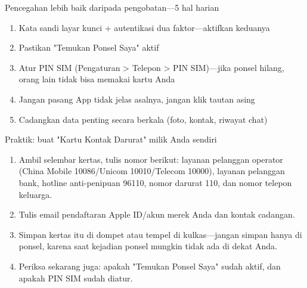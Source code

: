 \begin{tcbwarn}{Pencegahan lebih baik daripada pengobatan—5 hal harian}
\begin{enumerate}
  \item Kata sandi layar kunci + autentikasi dua faktor—aktifkan keduanya
  \item Pastikan "Temukan Ponsel Saya" aktif
  \item Atur PIN SIM (Pengaturan > Telepon > PIN SIM)—jika ponsel hilang, orang lain tidak bisa memakai kartu Anda
  \item Jangan pasang App tidak jelas asalnya, jangan klik tautan asing
  \item Cadangkan data penting secara berkala (foto, kontak, riwayat chat)
\end{enumerate}

\end{tcbwarn}

\begin{tcbpractice}{Praktik: buat "Kartu Kontak Darurat" milik Anda sendiri}
\begin{enumerate}
  \item Ambil selembar kertas, tulis nomor berikut: layanan pelanggan operator (China Mobile 10086/Unicom 10010/Telecom 10000), layanan pelanggan bank, hotline anti-penipuan 96110, nomor darurat 110, dan nomor telepon keluarga.
  \item Tulis email pendaftaran Apple ID/akun merek Anda dan kontak cadangan.
  \item Simpan kertas itu di dompet atau tempel di kulkas—jangan simpan hanya di ponsel, karena saat kejadian ponsel mungkin tidak ada di dekat Anda.
  \item Periksa sekarang juga: apakah "Temukan Ponsel Saya" sudah aktif, dan apakah PIN SIM sudah diatur.
\end{enumerate}

\end{tcbpractice}

